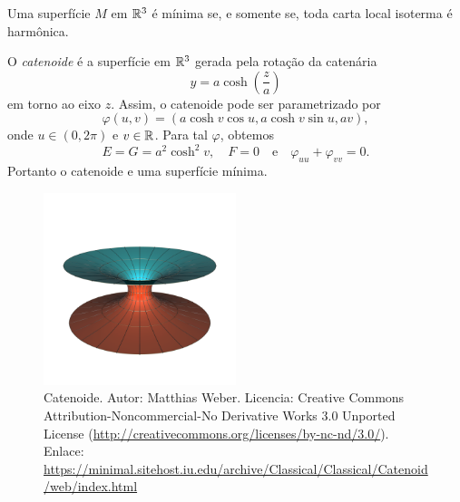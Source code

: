 \begin{corolario}\label{equiv_isoterma_harmonica}
	Uma superfície $M$ em $\mathbb{R}^3$ é mínima se, e somente se, toda carta local isoterma é harmônica.
\end{corolario}

\begin{exemplo}
	O \emph{catenoide} é a superfície em $\mathbb{R}^3$ gerada pela rotação da catenária 
	\begin{equation*}
	y = a \cosh \left( \frac{z}{a} \right)
	\end{equation*}
	em torno ao eixo $z$.
	Assim, o catenoide pode ser parametrizado por
	\begin{equation*}
	\varphi(u,v) = \left( a \cosh v \cos u, a \cosh v \sin u, av \right),
	\end{equation*}
	onde $u \in (0, 2 \pi)$ e $v \in \mathbb{R}$. Para tal $\varphi$, obtemos
	\begin{equation*}
	E = G = a^2 \cosh^2 v, \quad F = 0 \quad \text{e} \quad \varphi_{uu} + \varphi_{vv} = 0.
	\end{equation*}
	Portanto o catenoide e uma superfície mínima.
\end{exemplo}

\begin{figure}
	\centering
	\includegraphics[width=0.5\textwidth]{images/catenoid}
	\caption{Catenoide. Autor: Matthias Weber. Licencia: Creative Commons Attribution-Noncommercial-No Derivative Works 3.0 Unported License (\url{http://creativecommons.org/licenses/by-nc-nd/3.0/}). Enlace: \url{https://minimal.sitehost.iu.edu/archive/Classical/Classical/Catenoid/web/index.html}}
\end{figure}

